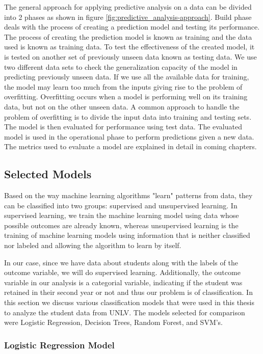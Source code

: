 \documentclass[11pt,openright]{report}
\begin{document}
The general approach for applying predictive analysis on a data can be divided into 2 phases as shown in figure \ref{fig:predictive_analysis-approach}. Build phase deals with the process of creating a prediction model and testing its performance. The process of creating the prediction model is known as training and the data used is known as training data. To test the effectiveness of the created model, it is tested on another set of previously unseen data known as testing data. We use two different data sets to check the generalization capacity of the model in predicting previously unseen data. If we use all the available data for training, the model may learn too much from the inputs giving rise to the problem of overfitting. Overfitting occurs when a model is performing well on its training data, but not on the other unseen data. A common approach to handle the problem of overfitting is to divide the input data into training and testing sets. The model is then evaluated for performance using test data.  The evaluated model is used in the operational phase to perform predictions given a new data. The metrics used to evaluate a model are explained in detail in coming chapters.


\subsection{Selected Models}
Based on the way machine learning algorithms "learn" patterns from data, they can be classified into two groups: supervised and unsupervised learning. In supervised learning, we train the machine learning model using data whose possible outcomes are already known, whereas unsupervised learning is the training of machine learning models using information that is neither classified nor labeled and allowing the algorithm to learn by itself. 

In our case, since we have data about students along with the labels of the outcome variable, we will do supervised learning. Additionally, the outcome variable in our analysis is a categorial variable, indicating if the student was retained in their second year or not and thus our problem is of classification. In this section we discuss various classification models that were used in this thesis to analyze the student data from UNLV. The models selected for comparison were Logistic Regression, Decision Trees, Random Forest, and SVM's.

\subsubsection {Logistic Regression Model}
\end{document}
